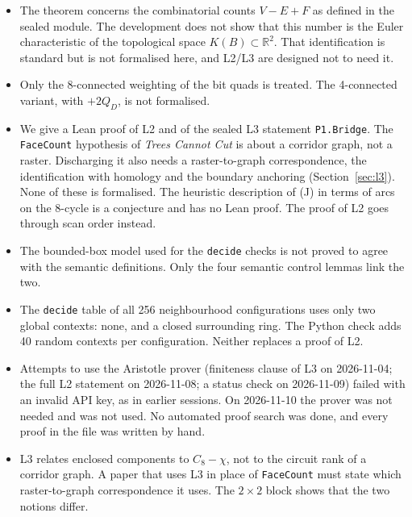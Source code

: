 \documentclass[11pt]{article}
\theoremstyle{definition}
\theoremstyle{remark}
\begin{document}
\begin{itemize}
\item The theorem concerns the combinatorial counts $V-E+F$ as defined in the
  sealed module. The development does not show that this number is the Euler
  characteristic of the topological space $K(B)\subset\mathbb{R}^2$. That
  identification is standard but is not formalised here, and L2/L3 are
  designed not to need it.
\item Only the 8-connected weighting of the bit quads is treated. The
  4-connected variant, with $+2Q_D$, is not formalised.
\item We give a Lean proof of L2 and of the sealed L3 statement \texttt{P1.Bridge}.
  The \texttt{FaceCount} hypothesis of \emph{Trees Cannot Cut} is about a corridor graph,
  not a raster. Discharging it also needs a raster-to-graph correspondence, the
  identification with homology and the boundary anchoring
  (Section~\ref{sec:l3}). None of these is formalised. The
  heuristic description of (J) in terms of arcs on the 8-cycle is a conjecture and
  has no Lean proof. The proof of L2 goes through scan order instead.
\item The bounded-box model used for the \texttt{decide} checks is not proved
  to agree with the semantic definitions. Only the four semantic control lemmas
  link the two.
\item The \texttt{decide} table of all 256 neighbourhood configurations
  uses only two global contexts: none, and a closed surrounding ring. The Python
  check adds 40 random contexts per configuration. Neither replaces a proof of
  L2.
\item Attempts to use the Aristotle prover (finiteness clause of L3 on
  2026-11-04; the full L2 statement on 2026-11-08; a status check on 2026-11-09)
  failed with an invalid API key, as in earlier sessions. On 2026-11-10 the prover was not
  needed and was not used. No automated proof search
  was done, and every proof in the file was written by hand.
\item L3 relates enclosed components to $C_8-\chi$, not to the circuit rank of
  a corridor graph. A paper that uses L3 in place of \texttt{FaceCount} must
  state which raster-to-graph correspondence it uses. The $2\times2$ block
  shows that the two notions differ.
\end{itemize}
\end{document}

